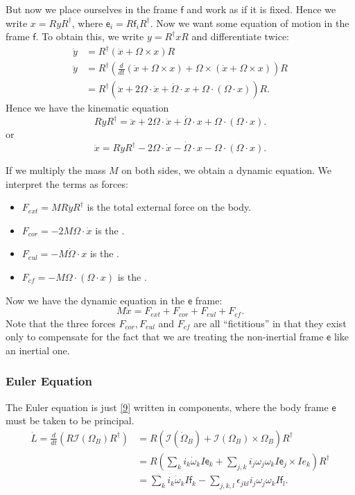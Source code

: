 But now we place ourselves in the frame $\mathsf{f}$ and work as if it is fixed. Hence we write $x = R y R^\dag$, where $\mathsf{e}_i = R \mathsf{f}_i R^{\dag} $. Now we want some equation of motion in the frame $\mathsf{f}$. To obtain this, we write  $y = R^\dag x R$ and differentiate twice:
\begin{align*}
	\dot y &= R^{\dag} \left( \dot{x} + \Omega \times x \right) R \\
	\ddot{y} &= R^{\dag} \left( \frac{d }{d t} \left( \dot{x} + \Omega \times x \right) + \Omega \times \left( \dot{x} + \Omega \times x \right)  \right) R \\
	&= R^{\dag} \left( \ddot{x} + 2 \Omega \cdot \dot{x} + \dot{\Omega} \cdot x + \Omega \cdot \left( \Omega \cdot x \right)  \right) R
.\end{align*}
Hence we have the kinematic equation
\[
	R \ddot{y} R^{\dag} = \ddot{x} + 2 \Omega \cdot \dot{x} + \dot{\Omega} \cdot x + \Omega \cdot \left( \Omega\cdot x \right) 
.\] 
or
\[
	\ddot{x} = R \ddot{y} R^{\dag} - 2 \Omega \cdot \dot{x} - \dot{\Omega} \cdot x - \Omega \cdot (\Omega \cdot x)
.\] 

If we multiply the mass $M$ on both sides, we obtain a dynamic equation. We interpret the terms as forces:
\begin{itemize}
	\item $F_{ext} = M R \ddot{y} R^{\dag}  $ is the total external force on the body.
	\item $F_{cor } = -2 M \Omega \cdot \dot{x}$ is the . 
	\item $F_{eul} = - M\dot{\Omega} \cdot x$ is the .
	\item $F_{cf} = - M \Omega \cdot  \left( \Omega \cdot  x \right) $ is the .
\end{itemize}
Now we have the dynamic equation in the $\mathsf{e}$ frame:
\[
	M \ddot{x} = F_{ext } + F_{cor } + F_{eul } + F_{cf}
.\] 
Note that the three forces $F_{cor }, F_{eul }$ and $F_{cf }$ are all ``fictitious'' in that they exist only to compensate for the fact that we are treating the non-inertial frame $\mathsf{e}$ like an inertial one.


\subsubsection{Euler Equation}

The Euler equation is just \eqref{9} written in components, where the body frame $\mathsf{e}$ must be taken to be principal.
\begin{align*}
	\dot{L} = 
\frac{d}{dt }(R\mathcal{I}(\Omega_B)R^\dag)
	&= R\left( \mathcal{I}(\dot \Omega_B) + \mathcal{I}(\Omega_B) \times \Omega_B \right) R^\dag\\
	&= R\left( \sum_{k} i_k \dot \omega_k I\mathsf{e}_k
	+ \sum_{j, k} i_j \omega_j \omega_k I\mathsf{e}_j \times I e_k \right) R^\dag \\
	&= \sum_k i_k \dot \omega_k I \mathsf{f}_k -
	\sum_{j, k, l} \epsilon_{jkl} i_j \omega_j \omega_k I \mathsf{f}_l
.\end{align*}

